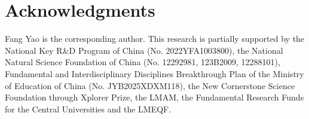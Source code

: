 \documentclass[numsec,webpdf,modern,large,namedate]{oup-authoring-template}
\theoremstyle{plain}
\theoremstyle{remark}
\begin{document}
\section{Acknowledgments}
Fang Yao is the corresponding author. This research is partially supported by the National Key R\&D Program of China (No. 2022YFA1003800), the National Natural Science Foundation of China (No. 12292981,  123B2009, 12288101), Fundamental and Interdisciplinary Disciplines Breakthrough Plan of the Ministry of Education of China (No. JYB2025XDXM118), the New Cornerstone Science Foundation through Xplorer Prize, the LMAM, the Fundamental Research Funds for the Central Universities and the LMEQF.




\end{document}
